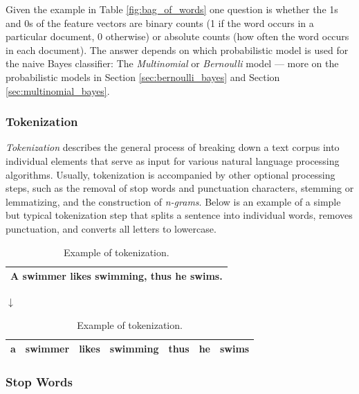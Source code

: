 \documentclass{article}
\begin{document}
Given the example in Table \ref{fig:bag_of_words} one question is whether the 1s and 0s of the feature vectors are binary counts (1 if the word occurs in a particular document, 0 otherwise) or absolute counts (how often the word occurs in each document). The answer depends  on which probabilistic model is used for the naive Bayes classifier: The \emph{Multinomial} or \emph{Bernoulli} model --- more on the probabilistic models in Section \ref{sec:bernoulli_bayes} and Section \ref{sec:multinomial_bayes}.


\subsubsection{Tokenization}
\label{sec:tokenization} 

\emph{Tokenization} describes the general process of breaking down a text corpus into individual elements that serve as input for various natural language processing algorithms. Usually, tokenization is accompanied by other optional processing steps, such as the removal of stop words and punctuation characters, stemming or lemmatizing, and the construction of \emph{n-grams}. Below is an example of a simple but typical tokenization step that splits a sentence into individual words, removes punctuation, and converts all letters to lowercase.


\begin{table}[H]
\caption{Example of tokenization.}
\begin{center}
\begin{tabular}{ | c | }

\hline
A swimmer likes swimming, thus he swims. \\ \hline
\end{tabular}

$\downarrow$

\begin{tabular}{ | c | c | c |  c | c | c | c |}
\hline
a & swimmer & likes & swimming & thus & he & swims \\ \hline
\end{tabular}
\end{center}

\end{table}




\subsubsection{Stop Words}
\label{sec:stopwords}
\end{document}
